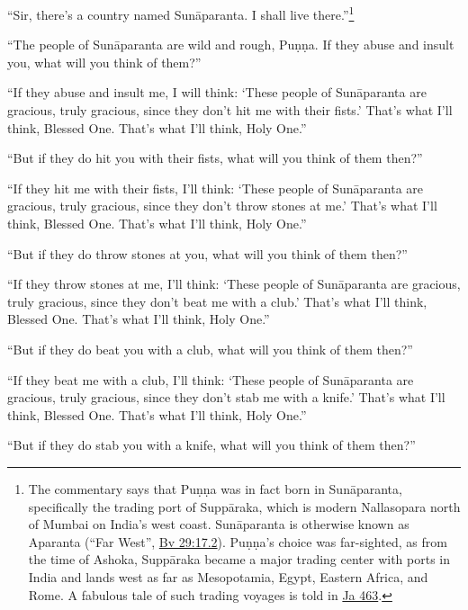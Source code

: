 \documentclass[12pt,openany]{book}%
\begin{document}
“Sir, there’s a country named \textsanskrit{Sunāparanta}. I shall live there.”\footnote{The commentary says that \textsanskrit{Puṇṇa} was in fact born in \textsanskrit{Sunāparanta}, specifically the trading port of \textsanskrit{Suppāraka}, which is modern Nallasopara north of Mumbai on India’s west coast. \textsanskrit{Sunāparanta} is otherwise known as Aparanta (“Far West”, \href{https://suttacentral.net/bv29/en/sujato\#17.2}{Bv 29:17.2}). \textsanskrit{Puṇṇa}’s choice was far-sighted, as from the time of Ashoka, \textsanskrit{Suppāraka} became a major trading center with ports in India and lands west as far as Mesopotamia, Egypt, Eastern Africa, and Rome. A fabulous tale of such trading voyages is told in \href{https://suttacentral.net/ja463/en/sujato}{Ja 463}. } 

“The people of \textsanskrit{Sunāparanta} are wild and rough, \textsanskrit{Puṇṇa}. If they abuse and insult you, what will you think of them?” 

“If they abuse and insult me, I will think: ‘These people of \textsanskrit{Sunāparanta} are gracious, truly gracious, since they don’t hit me with their fists.’ That’s what I’ll think, Blessed One. That’s what I’ll think, Holy One.” 

“But if they do hit you with their fists, what will you think of them then?” 

“If they hit me with their fists, I’ll think: ‘These people of \textsanskrit{Sunāparanta} are gracious, truly gracious, since they don’t throw stones at me.’ That’s what I’ll think, Blessed One. That’s what I’ll think, Holy One.” 

“But if they do throw stones at you, what will you think of them then?” 

“If they throw stones at me, I’ll think: ‘These people of \textsanskrit{Sunāparanta} are gracious, truly gracious, since they don’t beat me with a club.’ That’s what I’ll think, Blessed One. That’s what I’ll think, Holy One.” 

“But if they do beat you with a club, what will you think of them then?” 

“If they beat me with a club, I’ll think: ‘These people of \textsanskrit{Sunāparanta} are gracious, truly gracious, since they don’t stab me with a knife.’ That’s what I’ll think, Blessed One. That’s what I’ll think, Holy One.” 

“But if they do stab you with a knife, what will you think of them then?” 
\end{document}
